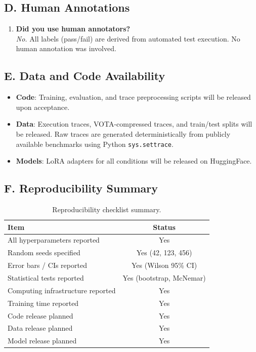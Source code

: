 \documentclass[11pt,a4paper]{article}
\begin{document}
\subsection*{D. Human Annotations}

\begin{enumerate}
\item \textbf{Did you use human annotators?} \\
\textit{No.} All labels (pass/fail) are derived from automated test execution. No human annotation was involved.
\end{enumerate}

\subsection*{E. Data and Code Availability}

\begin{itemize}
\item \textbf{Code}: Training, evaluation, and trace preprocessing scripts will be released upon acceptance.
\item \textbf{Data}: Execution traces, VOTA-compressed traces, and train/test splits will be released. Raw traces are generated deterministically from publicly available benchmarks using Python \texttt{sys.settrace}.
\item \textbf{Models}: LoRA adapters for all conditions will be released on HuggingFace.
\end{itemize}

\subsection*{F. Reproducibility Summary}

\begin{table}[h]
\centering
\small
\begin{tabular}{lc}
\toprule
\textbf{Item} & \textbf{Status} \\
\midrule
All hyperparameters reported & Yes \\
Random seeds specified & Yes (42, 123, 456) \\
Error bars / CIs reported & Yes (Wilson 95\% CI) \\
Statistical tests reported & Yes (bootstrap, McNemar) \\
Computing infrastructure reported & Yes \\
Training time reported & Yes \\
Code release planned & Yes \\
Data release planned & Yes \\
Model release planned & Yes \\
\bottomrule
\end{tabular}
\caption{Reproducibility checklist summary.}
\end{table}


\end{document}
